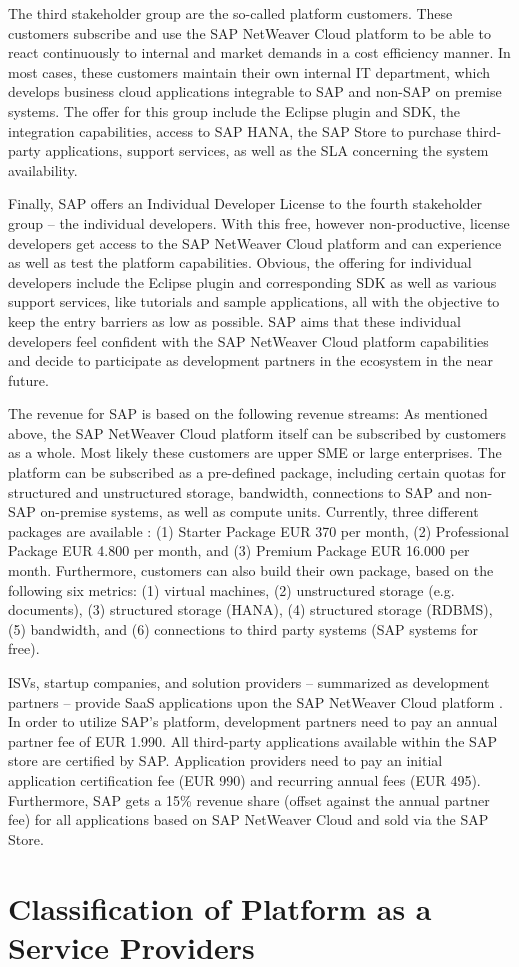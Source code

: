 The third stakeholder group are the so-called platform customers. These customers subscribe and use the SAP NetWeaver Cloud platform to be able to react continuously to internal and market demands in a cost efficiency manner. In most cases, these customers maintain their own internal IT department, which develops business cloud applications integrable to SAP and non-SAP on premise systems. The offer for this group include the Eclipse plugin and \ac{SDK}, the integration capabilities, access to SAP HANA, the SAP Store to purchase third-party applications, support services, as well as the \ac{SLA} concerning the system availability.

Finally, SAP offers an Individual Developer License to the fourth stakeholder group -- the individual developers. With this free, however non-productive, license developers get access to the SAP NetWeaver Cloud platform and can experience as well as test the platform capabilities. Obvious, the offering for individual developers include the Eclipse plugin and corresponding \ac{SDK} as well as various support services, like tutorials and sample applications, all with the objective to keep the entry barriers as low as possible. SAP aims that these individual developers feel confident with the SAP NetWeaver Cloud platform capabilities and decide to participate as development partners in the ecosystem in the near future.

The revenue for SAP is based on the following revenue streams: As mentioned above, the SAP NetWeaver Cloud platform itself can be subscribed by customers as a whole. Most likely these customers are upper \ac{SME} or large enterprises. The platform can be subscribed as a pre-defined package, including certain quotas for structured and unstructured storage, bandwidth, connections to SAP and non-SAP on-premise systems, as well as compute units. Currently, three different packages are available \citep{SAP2013b}: (1) Starter Package EUR 370 per month, (2) Professional Package EUR 4.800 per month, and (3) Premium Package EUR 16.000 per month. Furthermore, customers can also build their own package, based on the following six metrics: (1) virtual machines, (2) unstructured storage (e.g. documents), (3) structured storage (HANA), (4) structured storage (RDBMS), (5) bandwidth, and (6) connections to third party systems (SAP systems for free). 

\acp{ISV}, startup companies, and solution providers -- summarized as development partners -- provide \ac{SaaS} applications upon the SAP NetWeaver Cloud platform \citep{SAP2013a}. In order to utilize SAP's platform, development partners need to pay an annual partner fee of EUR 1.990. All third-party applications available within the SAP store are certified by SAP. Application providers need to pay an initial application certification fee (EUR 990) and recurring annual fees (EUR 495). Furthermore, SAP gets a 15\% revenue share (offset against the annual partner fee) for all applications based on SAP NetWeaver Cloud and sold via the SAP Store.



\section{Classification of Platform as a Service Providers}\label{ch:sota:cPaaS}



